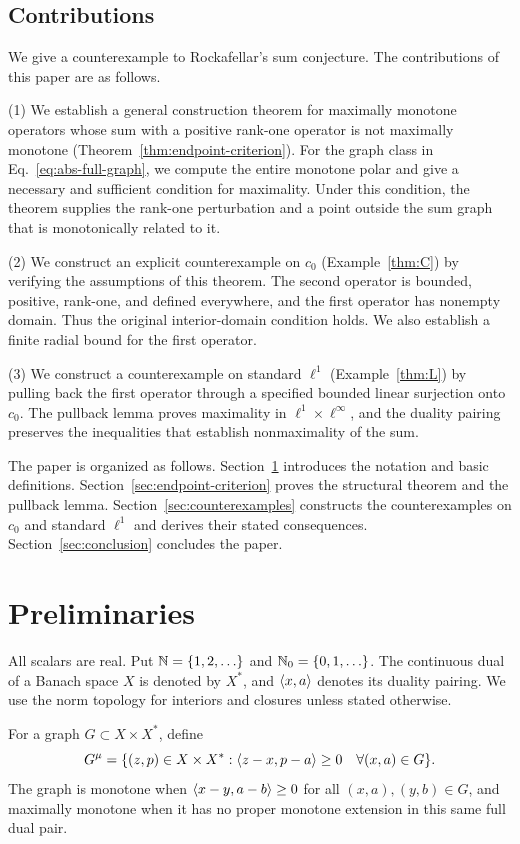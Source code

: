 \subsection{Contributions}
We give a counterexample to Rockafellar's sum conjecture.
The contributions of this paper are as follows.

(1) We establish a general construction theorem for maximally monotone
operators whose sum with a positive rank-one operator is not maximally
monotone (Theorem~\ref{thm:endpoint-criterion}). For the graph class in
Eq.~\eqref{eq:abs-full-graph}, we compute the entire monotone polar and
give a necessary and sufficient condition for maximality. Under this
condition, the theorem supplies the rank-one perturbation and a point
outside the sum graph that is monotonically related to it.

(2) We construct an explicit counterexample on $c_0$
(Example~\ref{thm:C}) by verifying the assumptions of this theorem.
The second operator is bounded, positive, rank-one, and defined everywhere,
and the first operator has nonempty domain. Thus the original
interior-domain condition holds. We also establish a finite radial
bound for the first operator.

(3) We construct a counterexample on standard $\ell^1$
(Example~\ref{thm:L}) by pulling back the first operator through a
specified bounded linear surjection onto $c_0$. The pullback lemma
proves maximality in $\ell^1\times\ell^\infty$, and the duality pairing
preserves the inequalities that establish nonmaximality of the sum.

The paper is organized as follows. Section~\ref{sec:definitions}
introduces the notation and basic definitions.
Section~\ref{sec:endpoint-criterion} proves the structural theorem and
the pullback lemma. Section~\ref{sec:counterexamples} constructs the
counterexamples on $c_0$ and standard $\ell^1$ and derives their stated
consequences. Section~\ref{sec:conclusion} concludes the paper.


\section{Preliminaries}
\label{sec:definitions}
All scalars are real. Put $\mathbb N=\{1,2,\ldots\}$ and $\mathbb N_0=\{0,1,\ldots\}$.
The continuous dual of a Banach space $X$ is denoted by $X^*$, and
$\langle x,a\rangle$ denotes its duality pairing. We use the norm topology for
interiors and closures unless stated otherwise.

\begin{definition}
For a graph $G\subset X\times X^*$, define
\begin{equation}
G^\mu=\{(z,p)\in X\times X^*:
 \langle z-x,p-a\rangle\ge0\quad\forall(x,a)\in G\}.
\label{eq:D1}
\end{equation}
The graph is monotone when $\langle x-y,a-b\rangle\ge0$ for all
$(x,a),(y,b)\in G$,
and maximally monotone when it has no proper monotone extension in this same
full dual pair.
\end{definition}

